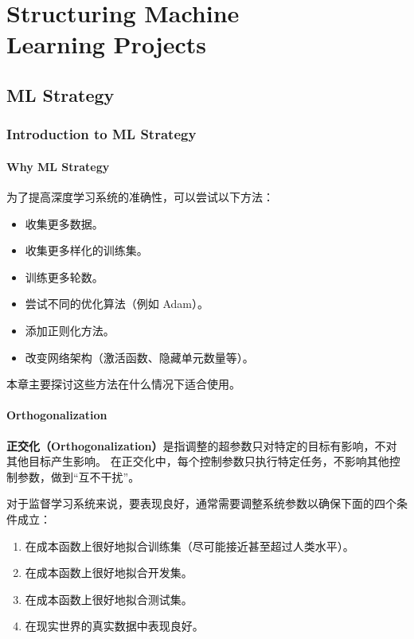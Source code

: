 \chapter[Structuring Machine Learning Projects]{Structuring Machine \\Learning Projects}

\section{ML Strategy}


\subsection{Introduction to ML Strategy}

\subsubsection{Why ML Strategy}

为了提高深度学习系统的准确性，可以尝试以下方法：

\begin{itemize}
    \item 收集更多数据。
    \item 收集更多样化的训练集。
    \item 训练更多轮数。
    \item 尝试不同的优化算法（例如 Adam）。
    \item 添加正则化方法。
    \item 改变网络架构（激活函数、隐藏单元数量等）。
\end{itemize}

本章主要探讨这些方法在什么情况下适合使用。

\subsubsection{Orthogonalization}

\textbf{正交化（Orthogonalization）}是指调整的超参数只对特定的目标有影响，不对其他目标产生影响。
在正交化中，每个控制参数只执行特定任务，不影响其他控制参数，做到“互不干扰”。

对于监督学习系统来说，要表现良好，通常需要调整系统参数以确保下面的四个条件成立：

\begin{enumerate}
    \item 在成本函数上很好地拟合训练集（尽可能接近甚至超过人类水平）。
    \item 在成本函数上很好地拟合开发集。
    \item 在成本函数上很好地拟合测试集。
    \item 在现实世界的真实数据中表现良好。
\end{enumerate}



